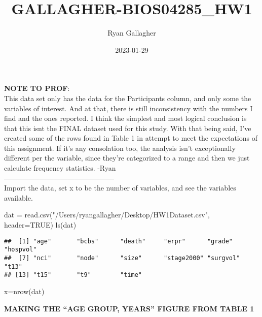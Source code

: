 \documentclass[
]{article}
\title{GALLAGHER-BIOS04285\_HW1}
\author{Ryan Gallagher}
\date{2023-01-29}
\newenvironment{Shaded}{\begin{snugshade}}{\end{snugshade}}
\newcommand{\AttributeTok}[1]{\textcolor[rgb]{0.77,0.63,0.00}{#1}}
\newcommand{\ConstantTok}[1]{\textcolor[rgb]{0.00,0.00,0.00}{#1}}
\newcommand{\FunctionTok}[1]{\textcolor[rgb]{0.00,0.00,0.00}{#1}}
\newcommand{\NormalTok}[1]{#1}
\newcommand{\OtherTok}[1]{\textcolor[rgb]{0.56,0.35,0.01}{#1}}
\newcommand{\StringTok}[1]{\textcolor[rgb]{0.31,0.60,0.02}{#1}}
\begin{document}
\maketitle

\textbf{NOTE TO PROF}:\\
This data set only has the data for the Participants column, and only
some the variables of interest. And at that, there is still
inconsistency with the numbers I find and the ones reported. I think the
simplest and most logical conclusion is that this isnt the FINAL dataset
used for this study. With that being said, I've created some of the rows
found in Table 1 in attempt to meet the expectations of this assignment.
If it's any consolation too, the analysis isn't exceptionally different
per the variable, since they're categorized to a range and then we just
calculate frequency statistics. -Ryan\\
-----------------------------------------------\\
Import the data, set x to be the number of variables, and see the
variables available.

\begin{Shaded}
\begin{Highlighting}[]
\NormalTok{dat }\OtherTok{=} \FunctionTok{read.csv}\NormalTok{(}\StringTok{"/Users/ryangallagher/Desktop/HW1Dataset.csv"}\NormalTok{, }\AttributeTok{header=}\ConstantTok{TRUE}\NormalTok{)}
\FunctionTok{ls}\NormalTok{(dat)}
\end{Highlighting}
\end{Shaded}

\begin{verbatim}
##  [1] "age"       "bcbs"      "death"     "erpr"      "grade"     "hospvol"  
##  [7] "nci"       "node"      "size"      "stage2000" "surgvol"   "t13"      
## [13] "t15"       "t9"        "time"
\end{verbatim}

\begin{Shaded}
\begin{Highlighting}[]
\NormalTok{x}\OtherTok{=}\FunctionTok{nrow}\NormalTok{(dat)}
\end{Highlighting}
\end{Shaded}

\hfill\break
\textbf{MAKING THE ``AGE GROUP, YEARS'' FIGURE FROM TABLE 1}
\end{document}
